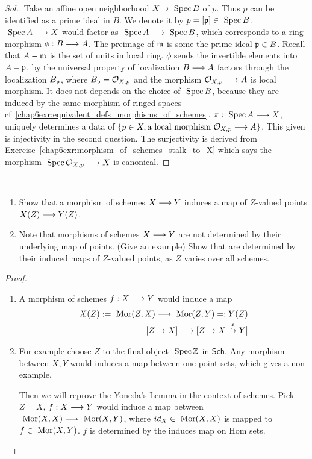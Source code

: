 \documentclass[11pt]{book} %
\begin{document}
\begin{proof}[Sol.]
Take an affine open neighborhood $X\supset \text{ Spec\,} B$ of $p$. Thus $p$ can be identified as a prime ideal in $B$. We denote it by $p=[{\mathfrak p}]\in\text{ Spec\,} B$. $\text{ Spec\,} A\longrightarrow X$ would factor as $\text{ Spec\,} A\longrightarrow\text{ Spec\,} B$, which corresponds to a ring morphism $\phi:B\longrightarrow A$. The preimage of ${\mathfrak m}$ is some the prime ideal ${\mathfrak p}\in B$. Recall that $A-{\mathfrak m}$ is the set of units in local ring.  $\phi$ sends the invertible elements into $A-{\mathfrak p}$, by the universal property of localization $B\longrightarrow A$ factors through the localization $B_{\mathfrak p}$, where $B_{\mathfrak p}={\cal O}_{X,p}$ and the morphism ${\cal O}_{X,p}\longrightarrow A$ is local morphism. It does not depends on the choice of $\text{ Spec\,} B$, because they are induced by the same morphism of ringed spaces cf~\ref{chap6exr:equivalent_defs_morphisms_of_schemes}. $\pi:\text{ Spec\,} A\longrightarrow X$, uniquely determines a data of $\{p\in X,\text{a local morphism } {\cal O}_{X,p}\longrightarrow A\}$. This given is injectivity in the second question. The surjectivity is derived from Exercise~\ref{chap6exr:morphism_of_schemes_stalk_to_X} which says the morphism $\text{ Spec\,} {\cal O}_{X,p}\longrightarrow X$ is canonical.
\end{proof}

\begin{exr}
\ \begin{enumerate}[label=(\alph*)]
\item Show that a morphism of schemes $X\longrightarrow Y$ induces a map of $Z$-valued points $X(Z)\longrightarrow Y(Z)$.
\item Note that morphisms of schemes $X\longrightarrow Y$ are not determined by their underlying map of points. (Give an example) Show that are determined by their induced maps of $Z$-valued points, as $Z$ varies over all schemes. 
\end{enumerate}
\end{exr}
\begin{proof}
\begin{enumerate}[label=(\alph*)]
\item 
A morphism of schemes $f:X\longrightarrow Y$ would induce a map
$$
\begin{aligned}
X(Z):=\mor(Z,X)
\lrta \mor(Z,Y)=:Y(Z)\\
[Z\rta X]\longmapsto [Z\rta X\overset{f}{\rta} Y]
\end{aligned}
$$
\item For example choose $Z$ to the final object $\text{ Spec\,} \mathbb Z$ in $\mathsf{Sch}$. Any morphism between $X,Y$ would induces a map between one point sets, which gives a non-example. 

Then we will reprove the Yoneda's Lemma in the context of schemes. Pick $Z=X$, $f:X\longrightarrow Y$ would induce a map between $\text{ Mor}(X,X)\longrightarrow \text{ Mor}(X,Y)$, where $id_X\in \text{ Mor}(X,X)$ is mapped to $f\in \text{ Mor}(X,Y)$. $f$ is determined by the induces map on Hom sets.
\end{enumerate}
\end{proof}
\end{document}
